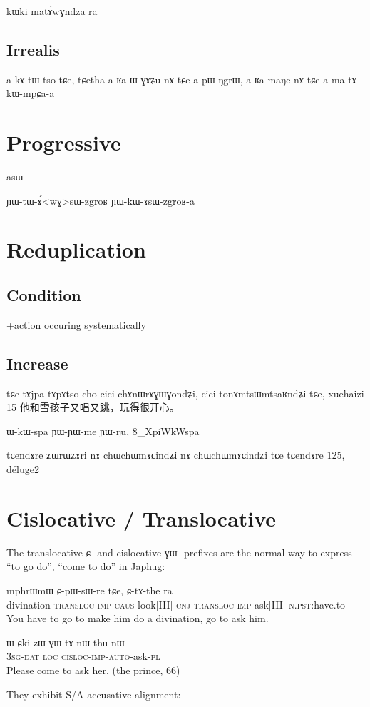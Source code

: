 \documentclass[oldfontcommands,oneside,a4paper,11pt]{memoir}
\newcommand{\ipa}[1]{{\phon #1}} %
\newcommand{\jg}[1]{\ipa{#1}\index{Japhug #1}}
\newcommand{\wav}[1]{}%
\begin{document}
kɯki matɤ́wɣndza ra
\subsection{Irrealis} \label{sub:irrealis}
a-kɤ-tɯ-tso tɕe, tɕetha a-ʁa ɯ-ɣɤʑu nɤ tɕe a-pɯ-ŋgrɯ, a-ʁa maŋe nɤ tɕe a-ma-tɤ-kɯ-mpɕa-a
\wav{8_apWNgrW}
\section{Progressive}

\jg{asɯ-}

ɲɯ-tɯ-ɤ́<wɣ>sɯ-zgroʁ
ɲɯ-kɯ-ɤsɯ-zgroʁ-a
\wav{8_YWtAwGsWzgroR}
\section{Reduplication}
\subsection{Condition}
+action occuring systematically
\subsection{Increase}


tɕe tɤjpa tɤpɤtso cho cici chɤnɯrɤɣɯɣondʑi, cici tonɤmtsɯmtsaʁndʑi tɕe,
xuehaizi 15 他和雪孩子又唱又跳，玩得很开心。


ɯ-kɯ-spa ɲɯ-ɲɯ-me ɲɯ-ŋu, 
8_XpiWkWspa


tɕendɤre ʑɯrɯʑɤri nɤ chɯchɯmɤɕindʑi nɤ chɯchɯmɤɕindʑi tɕe tɕendɤre
125, déluge2
\section{Cislocative / Translocative} \label{sec:cisloc}
The translocative  \ipa{ɕ-} and cislocative  \ipa{ɣɯ-} prefixes  are the normal way to express ``to go do'', ``come to do'' in Japhug:
\begin{exe}
\ex 
\gll mphrɯmɯ	ɕ-pɯ-sɯ-re	tɕe,	ɕ-tɤ-the	ra \\
 divination \textsc{transloc}-\textsc{imp}-\textsc{caus}-look[III] \textsc{cnj} \textsc{transloc}-\textsc{imp}-ask[III] \textsc{n.pst}:have.to \\
 \glt You have to go to make him do a divination, go to ask him.
 
 \ex
\gll 	ɯ-ɕki	zɯ	ɣɯ-tɤ-nɯ-thu-nɯ	\\
3\textsc{sg}-\textsc{dat}  \textsc{loc}  \textsc{cisloc}-\textsc{imp}-\textsc{auto}-ask-\textsc{pl} \\
\glt 	Please come  to ask her. (the prince, 66)
\end{exe}
They exhibit S/A accusative alignment:
\end{document}
